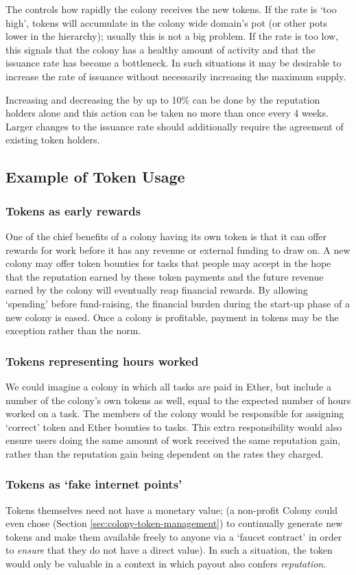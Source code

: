 The  controls how rapidly the colony receives the new tokens. If the rate is `too high', tokens will accumulate in the colony wide domain's pot (or other pots lower in the hierarchy); usually this is not a big problem. If the rate is too low, this signals that the colony has a healthy amount of activity and that the issuance rate has become a bottleneck. In such situations it may be desirable to increase the rate of issuance without necessarily increasing the maximum supply.

Increasing and decreasing the  by up to 10\% can be done by the reputation holders alone and this action can be taken no more than once every 4 weeks. Larger changes to the issuance rate should additionally require the agreement of existing token holders.


\subsection{Example of Token Usage}\label{sec:colony-token-examples}
\subsubsection*{Tokens as early rewards}
One of the chief benefits of a colony having its own token is that it can offer rewards for work before it has any revenue or external funding to draw on.
A new colony may offer token bounties for tasks that people may accept in the hope that the reputation earned by these token payments and the future revenue earned by the colony will eventually reap financial rewards. By allowing `spending' before fund-raising, the financial burden during the start-up phase of a new colony is eased. Once a colony is profitable, payment in tokens may be the exception rather than the norm.

\subsubsection*{Tokens representing hours worked}
We could imagine a colony in which all tasks are paid in Ether, but include a number of the colony's own tokens as well, equal to the expected number of hours worked on a task. The members of the colony would be responsible for assigning `correct' token and Ether bounties to tasks. This extra responsibility would also ensure users doing the same amount of work received the same reputation gain, rather than the reputation gain being dependent on the rates they charged.

\subsubsection*{Tokens as `fake internet points'}
Tokens themselves need not have a monetary value; (a non-profit Colony could even chose (Section \ref{sec:colony-token-management}) to continually generate new tokens and make them available freely to anyone via a `faucet contract' in order to \emph{ensure} that they do not have a direct value). In such a situation, the token would only be valuable in a context in which payout also confers \emph{reputation}.